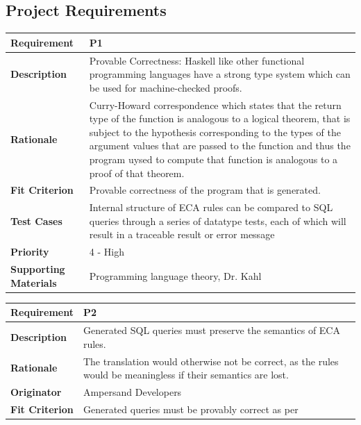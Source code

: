 \documentclass[12pt]{report}
\begin{document}
{\subsection{Project Requirements}
{\setlength{\tabcolsep}{6pt} %
    \begin{tabularx}{\textwidth}{>{\bfseries}C{3cm}X}
        Requirement & P1 \\ 
        \midrule
        \endhead
        Description  & Provable Correctness: Haskell like other functional 
        programming languages have 
        a strong type system which can be used for machine-checked proofs.
        \\	Rationale & Curry-Howard correspondence which states that the 
        return type of the function is analogous to a logical theorem, that is 
        subject to the hypothesis corresponding to the types of the argument 
        values that are passed to the function and thus the program uysed to 
        compute that function is analogous to a proof of that theorem.
        \\	Fit Criterion & Provable correctness of the program that is 
        generated.
        \\ Test Cases & Internal structure of ECA rules can be compared to SQL 
        queries through a series of datatype tests, each of which will result 
        in a traceable result or error message
        \\	Priority & 4 - High
        \\	Supporting Materials & Programming language theory, Dr. Kahl
        \vspace{12pt}
    \end{tabularx}
}
{\setlength{\tabcolsep}{6pt} %
    \begin{tabularx}{\textwidth}{>{\bfseries}C{3cm}X}
        Requirement & P2 \\ 
        \midrule
        \endhead
        Description  & Generated SQL queries must preserve the semantics of ECA 
        rules.  
        \\	Rationale & The translation would otherwise not be correct, as the 
        rules would be meaningless if their semantics are lost.
        \\	Originator & Ampersand Developers
        \\	Fit Criterion & Generated queries must be provably correct as per 

\end{tabularx}}}
\end{document}
